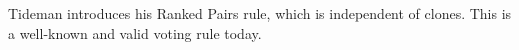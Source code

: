 Tideman introduces his Ranked Pairs rule, which is independent of clones.  This is a well-known and valid voting rule today.
